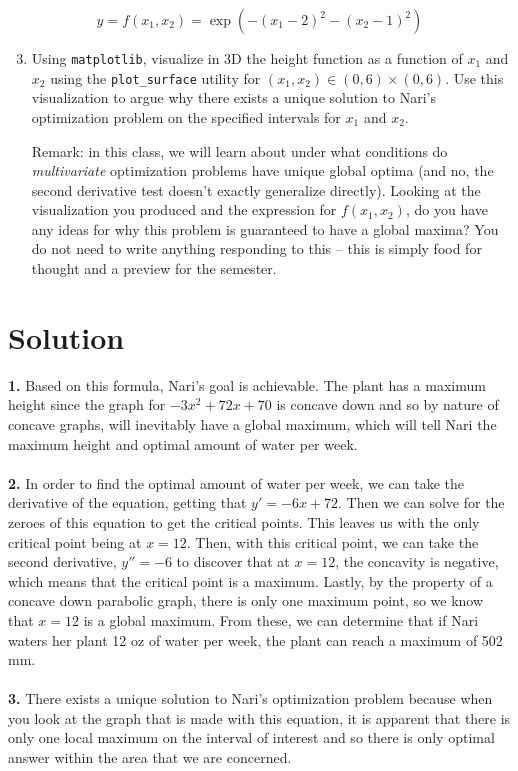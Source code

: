 \documentclass{harvardml}
\theoremstyle{definition}
\theoremstyle{plain}
\newenvironment{solution}
  {\color{blue}\section*{Solution}}
{}
\begin{document}
\begin{problem}
$$y = f(x_1, x_2) = \exp\left(-(x_1 - 2)^2 - (x_2 - 1)^2 \right)$$
\begin{enumerate}
    \setcounter{enumi}{2}
    \item Using \texttt{matplotlib}, visualize in 3D the height function as a function of $x_1$ and $x_2$ using the \texttt{plot\_surface} utility for $(x_1, x_2) \in (0, 6) \times (0, 6)$. Use this visualization to argue why there exists a unique solution to Nari's optimization problem on the specified intervals for $x_1$ and $x_2$.

    Remark: in this class, we will learn about under what conditions do \textit{multivariate} optimization problems have unique global optima (and no, the second derivative test doesn't exactly generalize directly). Looking at the visualization you produced and the expression for $f(x_1, x_2)$, do you have any ideas for why this problem is guaranteed to have a global maxima? You do not need to write anything responding to this -- this is simply food for thought and a preview for the semester.
\end{enumerate}
\end{problem}

\newpage


\begin{solution}
    \textbf{1.} Based on this formula, Nari's goal is achievable. The plant has a maximum height since the graph for $-3x^2 + 72x + 70$ is concave down and so by nature of concave graphs, will inevitably have a global maximum, which will tell Nari the maximum height and optimal amount of water per week. \\\\

    \textbf{2.} In order to find the optimal amount of water per week, we can take the derivative of the equation, getting that $y' = -6x + 72$. Then we can solve for the zeroes of this equation to get the critical points. 
    This leaves us with the only critical point being at $x = 12$. Then, with this critical point, we can take the second derivative, $y'' = -6$ to discover that at $x=12$, the concavity is negative, which means that the critical point is a maximum. 
    Lastly, by the property of a concave down parabolic graph, there is only one maximum point, so we know that $x = 12$ is a global maximum. From these, we can determine that if Nari waters her plant
    12 oz of water per week, the plant can reach a maximum of 502 mm. \\\\

    \textbf{3. } There exists a unique solution to Nari's optimization problem because when you look at the graph that is made with this equation, it is apparent that there is only one local maximum
    on the interval of interest and so there is only optimal answer within the area that we are concerned. 
\end{solution}
\end{document}
